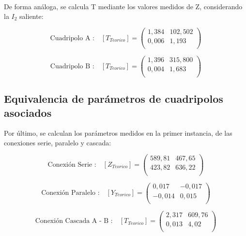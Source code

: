 \documentclass[a4paper]{article}
\begin{document}
De forma análoga, se calcula T mediante los valores medidos de Z, considerando la $I_2$ saliente: 

\begin{equation}
\text{Cuadripolo A :}\quad [T_{Teorico}] =
\left( \begin{array}{cc}
	1,384 & 102,502\\
	0,006 & 1,193\\
\end{array} \right)
\end{equation}

\begin{equation}
\text{Cuadripolo B :}\quad [T_{Teorico}] =
\left( \begin{array}{cc}
	1,396 & 315,800\\
	0,004 & 1,683\\
\end{array} \right)
\end{equation}

\subsection*{Equivalencia de parámetros de cuadripolos asociados}

Por último, se calculan los parámetros medidos en la primer instancia, de las conexiones serie, paralelo y cascada:

\begin{equation}
\text{Conexión Serie :}\quad [Z_{Teorico}] =
\left( \begin{array}{cc}
	589,81 & 467,65\\
	423,82 & 636,22\\
\end{array} \right)
\end{equation}

\begin{equation}
\text{Conexión Paralelo :}\quad [Y_{Teorico}] =
\left( \begin{array}{cc}
	0,017 & -0,017\\
	-0,014 & 0,015\\
\end{array} \right)
\end{equation}

\begin{equation}
\text{Conexión Cascada A - B :}\quad [T_{Teorico}] =
\left( \begin{array}{cc}
	2,317 & 609,76\\
	0,013 & 4,02\\
\end{array} \right)
\end{equation}
\end{document}

